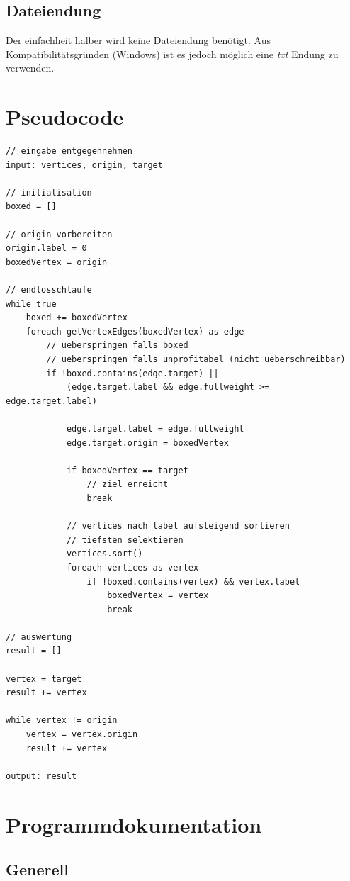 \documentclass[a4paper,titlepage]{article}
\begin{document}
\subsection{Dateiendung}

Der einfachheit halber wird keine Dateiendung benötigt. Aus Kompatibilitätsgründen (Windows) ist es jedoch möglich eine \emph{txt} Endung zu verwenden.

\newpage

\section{Pseudocode}

\begin{lstlisting}
// eingabe entgegennehmen
input: vertices, origin, target

// initialisation
boxed = []

// origin vorbereiten
origin.label = 0
boxedVertex = origin

// endlosschlaufe
while true
	boxed += boxedVertex
	foreach getVertexEdges(boxedVertex) as edge
		// ueberspringen falls boxed
		// ueberspringen falls unprofitabel (nicht ueberschreibbar)
		if !boxed.contains(edge.target) ||
			(edge.target.label && edge.fullweight >= edge.target.label)

			edge.target.label = edge.fullweight
			edge.target.origin = boxedVertex

			if boxedVertex == target
				// ziel erreicht
				break

			// vertices nach label aufsteigend sortieren
			// tiefsten selektieren
			vertices.sort()
			foreach vertices as vertex
				if !boxed.contains(vertex) && vertex.label
					boxedVertex = vertex
					break

// auswertung
result = []

vertex = target
result += vertex

while vertex != origin
	vertex = vertex.origin
	result += vertex

output: result
\end{lstlisting}

\newpage

\section{Programmdokumentation}

\subsection{Generell}
\end{document}

